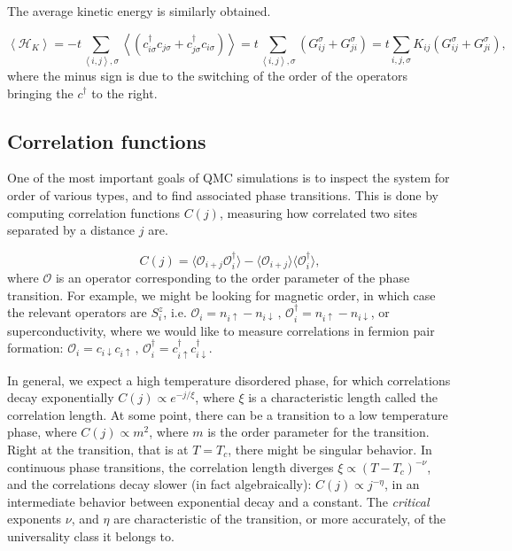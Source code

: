 The average kinetic energy is similarly obtained.

\begin{equation}
\left\langle \mathcal{H}_K \right\rangle = - t  \sum_{\left\langle i, j \right\rangle , \sigma} \left\langle ( c_{i\sigma}^\dagger c_{j\sigma} + c_{j\sigma}^\dagger c_{i\sigma} ) \right\rangle = t \sum_{\left\langle i, j \right\rangle , \sigma} ( G_{ij}^\sigma + G_{ji}^\sigma ) = t \sum_{ i, j , \sigma} K_{ij} ( G_{ij}^\sigma + G_{ji}^\sigma )  ,
\end{equation}
where the minus sign is due to the switching of the order of the operators bringing the $c^\dagger$ to the right.

\subsection{Correlation functions}

One of the most important goals of QMC simulations is to inspect the system for order of various types, and to find  associated phase transitions. This is done by computing correlation functions $C (j) $, measuring how correlated two sites separated by a distance $j$ are.

\begin{equation}
C(j) = \big\langle \mathcal{O}_{i+j} \mathcal{O}_{i}^\dagger \big\rangle - \langle \mathcal{O}_{i+j} \big\rangle\big\langle\mathcal{O}_{i}^\dagger \big\rangle ,
\end{equation}
where $\mathcal{O}$ is an operator corresponding to the order parameter of the phase transition. For example, we might be looking for magnetic order, in which case the relevant operators are $S^z_i$, i.e. $\mathcal{O}_i = n_{i\uparrow} - n_{i\downarrow} \, , \, \mathcal{O}_i^\dagger = n_{i\uparrow} - n_{i\downarrow}$, or superconductivity, where we would like to measure correlations in fermion pair formation: $\mathcal{O}_i = c_{i\downarrow} c_{i\uparrow} \, , \, \mathcal{O}_i^\dagger = c_{i\uparrow}^\dagger c_{i\downarrow}^\dagger$.

In general, we expect a high temperature disordered phase, for which correlations decay exponentially $C(j) \propto e^{-j/\xi}$, where $\xi$ is a characteristic length called the correlation length. At some point, there can be a transition to a low temperature phase, where $C(j) \propto m^2$, where $m$ is the order parameter for the transition. Right at the transition, that is at $T = T_c$, there might be singular behavior. In continuous phase transitions, the correlation length diverges $\xi \propto (T-T_c)^{-\nu}$, and the correlations decay slower (in fact algebraically): $C(j) \propto j^{-\eta}$, in an intermediate behavior between exponential decay and a constant. The \emph{critical} exponents $\nu$, and $\eta$ are characteristic of the transition, or more accurately, of the universality class it belongs to.

